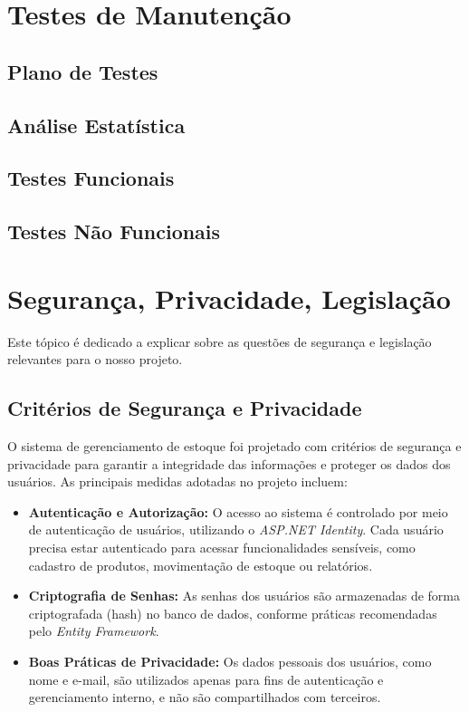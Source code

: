 \documentclass[
	12pt,				%
	openright,			%
	twoside,			%
	a4paper,			%
	english,			%
	french,				%
	spanish,			%
	brazil				%
	]{abntex2}
\begin{document}
\section{Testes de Manutenção}

\subsection{Plano de Testes}

\subsection{Análise Estatística}

\subsection{Testes Funcionais}

\subsection{Testes Não Funcionais}


\section{Segurança, Privacidade, Legislação}

Este tópico é dedicado a explicar sobre as questões de segurança e legislação relevantes para o nosso projeto.


\subsection{Critérios de Segurança e Privacidade}

O sistema de gerenciamento de estoque foi projetado com critérios de segurança e privacidade para garantir a integridade das informações e proteger os dados dos usuários. As principais medidas adotadas no projeto incluem:

\begin{itemize}
    \item \textbf{Autenticação e Autorização:} O acesso ao sistema é controlado por meio de autenticação de usuários, utilizando o \textit{ASP.NET Identity}. Cada usuário precisa estar autenticado para acessar funcionalidades sensíveis, como cadastro de produtos, movimentação de estoque ou relatórios.

    \item \textbf{Criptografia de Senhas:} As senhas dos usuários são armazenadas de forma criptografada (hash) no banco de dados, conforme práticas recomendadas pelo \textit{Entity Framework}.

    \item \textbf{Boas Práticas de Privacidade:} Os dados pessoais dos usuários, como nome e e-mail, são utilizados apenas para fins de autenticação e gerenciamento interno, e não são compartilhados com terceiros.
\end{itemize}
\end{document}
